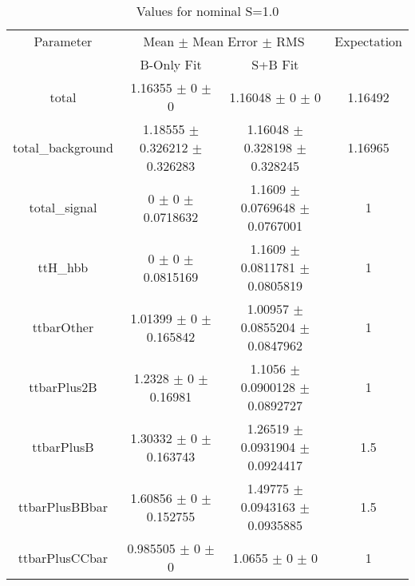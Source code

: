 \begin{table}
\centering
\caption{Values for nominal S=1.0}
\begin{tabular}{cccc}
\toprule
Parameter & \multicolumn{2}{c}{Mean $\pm$ Mean Error $\pm$ RMS} & Expectation\\
 & B-Only Fit & S+B Fit & \\
\midrule
total & \num{1.16355} $\pm$ \num{0} $\pm$ \num{0} & \num{1.16048} $\pm$ \num{0} $\pm$ \num{0} & \num{1.16492}\\
total\_background & \num{1.18555} $\pm$ \num{0.326212} $\pm$ \num{0.326283} & \num{1.16048} $\pm$ \num{0.328198} $\pm$ \num{0.328245} & \num{1.16965}\\
total\_signal & \num{0} $\pm$ \num{0} $\pm$ \num{0.0718632} & \num{1.1609} $\pm$ \num{0.0769648} $\pm$ \num{0.0767001} & \num{1}\\
ttH\_hbb & \num{0} $\pm$ \num{0} $\pm$ \num{0.0815169} & \num{1.1609} $\pm$ \num{0.0811781} $\pm$ \num{0.0805819} & \num{1}\\
ttbarOther & \num{1.01399} $\pm$ \num{0} $\pm$ \num{0.165842} & \num{1.00957} $\pm$ \num{0.0855204} $\pm$ \num{0.0847962} & \num{1}\\
ttbarPlus2B & \num{1.2328} $\pm$ \num{0} $\pm$ \num{0.16981} & \num{1.1056} $\pm$ \num{0.0900128} $\pm$ \num{0.0892727} & \num{1}\\
ttbarPlusB & \num{1.30332} $\pm$ \num{0} $\pm$ \num{0.163743} & \num{1.26519} $\pm$ \num{0.0931904} $\pm$ \num{0.0924417} & \num{1.5}\\
ttbarPlusBBbar & \num{1.60856} $\pm$ \num{0} $\pm$ \num{0.152755} & \num{1.49775} $\pm$ \num{0.0943163} $\pm$ \num{0.0935885} & \num{1.5}\\
ttbarPlusCCbar & \num{0.985505} $\pm$ \num{0} $\pm$ \num{0} & \num{1.0655} $\pm$ \num{0} $\pm$ \num{0} & \num{1}\\
\bottomrule
\end{tabular}
\end{table}